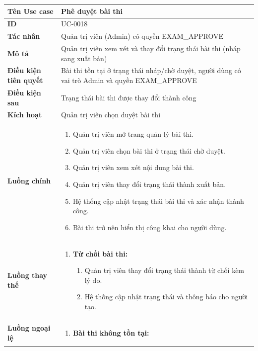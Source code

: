 {
\renewcommand{\arraystretch}{1.5}

\begin{tabularx}{\textwidth}{|>{\raggedright\arraybackslash}X|>{\raggedright\arraybackslash}X|}
\hline
\textbf{Tên Use case} & Phê duyệt bài thi \\
\hline
\textbf{ID} & UC-0018 \\
\hline
\textbf{Tác nhân} & Quản trị viên (Admin) có quyền EXAM\_APPROVE \\
\hline
\textbf{Mô tả} & Quản trị viên xem xét và thay đổi trạng thái bài thi (nháp sang xuất bản) \\
\hline
\textbf{Điều kiện tiên quyết} & Bài thi tồn tại ở trạng thái nháp/chờ duyệt, người dùng có vai trò Admin và quyền EXAM\_APPROVE \\
\hline
\textbf{Điều kiện sau} & Trạng thái bài thi được thay đổi thành công \\
\hline
\textbf{Kích hoạt} & Quản trị viên chọn duyệt bài thi \\
\hline
\textbf{Luồng chính} &
\begin{enumerate}
    \item Quản trị viên mở trang quản lý bài thi.
    \item Quản trị viên chọn bài thi ở trạng thái chờ duyệt.
    \item Quản trị viên xem xét nội dung bài thi.
    \item Quản trị viên thay đổi trạng thái thành xuất bản.
    \item Hệ thống cập nhật trạng thái bài thi và xác nhận thành công.
    \item Bài thi trở nên hiển thị công khai cho người dùng.
\end{enumerate} \\
\hline
\textbf{Luồng thay thế} &
\begin{enumerate}
    \item \textbf{Từ chối bài thi:}
    \begin{enumerate}
        \item[4A.] Quản trị viên thay đổi trạng thái thành từ chối kèm lý do.
        \item[5A.] Hệ thống cập nhật trạng thái và thông báo cho người tạo.
    \end{enumerate}
\end{enumerate} \\
\hline
\textbf{Luồng ngoại lệ} &
\begin{enumerate}
    \item \textbf{Bài thi không tồn tại:}

\end{enumerate}
\end{tabularx}}
